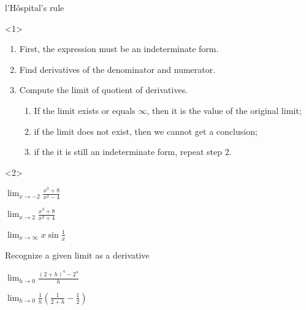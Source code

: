 \begin{frame}{l'Hôspital's rule}

\begin{onlyenv}<1>

\begin{enumerate}
\item First, the expression must be an indeterminate form.
\item Find derivatives of the denominator and numerator.
\item Compute the limit of quotient of derivatives.

\begin{enumerate}
\item If the limit exists or equals $\infty$, then it is the value of the
original limit;
\item if the limit does not exist, then we cannot get a conclusion;
\item if the it is still an indeterminate form, repeat step 2.
\end{enumerate}
\end{enumerate}
\end{onlyenv}



\begin{onlyenv}<2>

\begin{example}
$\lim_{x\to-2}\frac{x^{3}+8}{x^{2}-4}$
\end{example}



\begin{example}
$\lim_{x\to2}\frac{x^{3}+8}{x^{2}+4}$
\end{example}



\begin{example}
$\lim_{x\to\infty}x\sin\frac{1}{x}$
\end{example}

\end{onlyenv}

\end{frame}

\begin{frame}{Recognize a given limit as a derivative}

\begin{example}
$\lim_{h\to0}\frac{\left(2+h\right)^{4}-2^{4}}{h}$
\end{example}



\begin{example}
$\lim_{h\to0}\frac{1}{h}\left(\frac{1}{2+h}-\frac{1}{2}\right)$
\end{example}

\end{frame}



